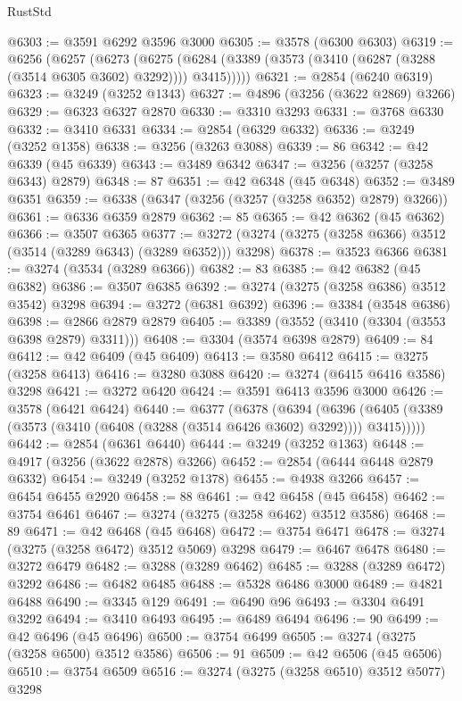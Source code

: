 \begin{lexlean}{RustStd}
\begin{coremodule}
@6303 := @3591 @6292 @3596 @3000
@6305 := @3578 (@6300 @6303)
@6319 := @6256
    (@6257
      (@6273
        (@6275 (@6284 (@3389 (@3573 (@3410 (@6287 (@3288 (@3514 @6305 @3602) @3292)))) @3415)))))
@6321 := @2854 (@6240 @6319)
@6323 := @3249 (@3252 @1343)
@6327 := @4896 (@3256 (@3622 @2869) @3266)
@6329 := @6323 @6327 @2870
@6330 := @3310 @3293
@6331 := @3768 @6330
@6332 := @3410 @6331
@6334 := @2854 (@6329 @6332)
@6336 := @3249 (@3252 @1358)
@6338 := @3256 (@3263 @3088)
@6339 := 86
@6342 := @42 @6339 (@45 @6339)
@6343 := @3489 @6342
@6347 := @3256 (@3257 (@3258 @6343) @2879)
@6348 := 87
@6351 := @42 @6348 (@45 @6348)
@6352 := @3489 @6351
@6359 := @6338 (@6347 (@3256 (@3257 (@3258 @6352) @2879) @3266))
@6361 := @6336 @6359 @2879
@6362 := 85
@6365 := @42 @6362 (@45 @6362)
@6366 := @3507 @6365
@6377 := @3272 (@3274 (@3275 (@3258 @6366) @3512 (@3514 (@3289 @6343) (@3289 @6352))) @3298)
@6378 := @3523 @6366
@6381 := @3274 (@3534 (@3289 @6366))
@6382 := 83
@6385 := @42 @6382 (@45 @6382)
@6386 := @3507 @6385
@6392 := @3274 (@3275 (@3258 @6386) @3512 @3542) @3298
@6394 := @3272 (@6381 @6392)
@6396 := @3384 (@3548 @6386)
@6398 := @2866 @2879 @2879
@6405 := @3389 (@3552 (@3410 (@3304 (@3553 @6398 @2879) @3311)))
@6408 := @3304 (@3574 @6398 @2879)
@6409 := 84
@6412 := @42 @6409 (@45 @6409)
@6413 := @3580 @6412
@6415 := @3275 (@3258 @6413)
@6416 := @3280 @3088
@6420 := @3274 (@6415 @6416 @3586) @3298
@6421 := @3272 @6420
@6424 := @3591 @6413 @3596 @3000
@6426 := @3578 (@6421 @6424)
@6440 := @6377
    (@6378
      (@6394
        (@6396 (@6405 (@3389 (@3573 (@3410 (@6408 (@3288 (@3514 @6426 @3602) @3292)))) @3415)))))
@6442 := @2854 (@6361 @6440)
@6444 := @3249 (@3252 @1363)
@6448 := @4917 (@3256 (@3622 @2878) @3266)
@6452 := @2854 (@6444 @6448 @2879 @6332)
@6454 := @3249 (@3252 @1378)
@6455 := @4938 @3266
@6457 := @6454 @6455 @2920
@6458 := 88
@6461 := @42 @6458 (@45 @6458)
@6462 := @3754 @6461
@6467 := @3274 (@3275 (@3258 @6462) @3512 @3586)
@6468 := 89
@6471 := @42 @6468 (@45 @6468)
@6472 := @3754 @6471
@6478 := @3274 (@3275 (@3258 @6472) @3512 @5069) @3298
@6479 := @6467 @6478
@6480 := @3272 @6479
@6482 := @3288 (@3289 @6462)
@6485 := @3288 (@3289 @6472) @3292
@6486 := @6482 @6485
@6488 := @5328 @6486 @3000
@6489 := @4821 @6488
@6490 := @3345 @129
@6491 := @6490 @96
@6493 := @3304 @6491 @3292
@6494 := @3410 @6493
@6495 := @6489 @6494
@6496 := 90
@6499 := @42 @6496 (@45 @6496)
@6500 := @3754 @6499
@6505 := @3274 (@3275 (@3258 @6500) @3512 @3586)
@6506 := 91
@6509 := @42 @6506 (@45 @6506)
@6510 := @3754 @6509
@6516 := @3274 (@3275 (@3258 @6510) @3512 @5077) @3298

\end{coremodule}
\end{lexlean}
